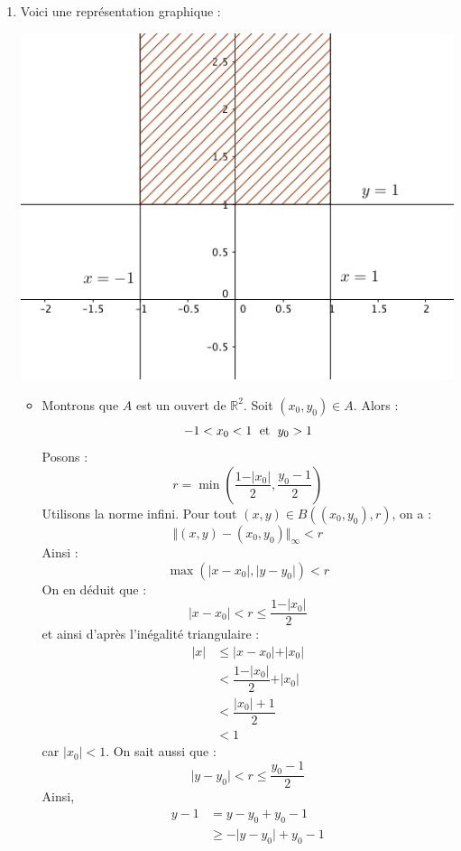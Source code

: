 \documentclass[a4paper,twoside,french,11pt]{VcCours}
\newcommand{\corr}{\textbf{Corrigé:}}
\begin{document}

\begin{enumerate}
\item Voici une représentation graphique : 

\begin{center}
\includegraphics[scale=0.5]{im1}
\end{center}
\begin{itemize}
\item Montrons que $A$ est un ouvert de $\mathbb{R}^2$. Soit $(x_0,y_0) \in A$. Alors :
$$ -1 < x_0 < 1 \; \hbox{ et } \; y_0>1$$
Posons :
$$ r = \min \left( \dfrac{1-\vert x_0\vert}{2}, \dfrac{y_0-1}{2} \right)$$
Utilisons la norme infini. Pour tout $(x,y) \in B((x_0,y_0),r)$, on a :
$$ \Vert (x,y)-(x_0,y_0) \Vert_{\infty} <r $$
Ainsi :
$$ \max (\vert x-x_0 \vert, \vert y-y_0 \vert)<r$$
On en déduit que :
$$ \vert x-x_0 \vert < r \leq \dfrac{1-\vert x_0\vert}{2}$$
et ainsi d'après l'inégalité triangulaire :
\begin{align*}
\vert x \vert & \leq \vert x-x_0 \vert + \vert x_0 \vert \\
& <\dfrac{1-\vert x_0\vert}{2} + \vert x_0 \vert \\ 
& < \dfrac{\vert x_0 \vert + 1 }{2}\\
& < 1
\end{align*}
car $\vert x_0 \vert <1$. On sait aussi que :
$$  \vert y-y_0 \vert < r \leq \dfrac{y_0-1}{2}$$
Ainsi, 
\begin{align*}
y-1 &= y-y_0 + y_0-1 \\
& \geq - \vert y- y_0 \vert + y_0-1 \\

\end{align*}
\end{itemize}
\end{enumerate}
\end{document}
